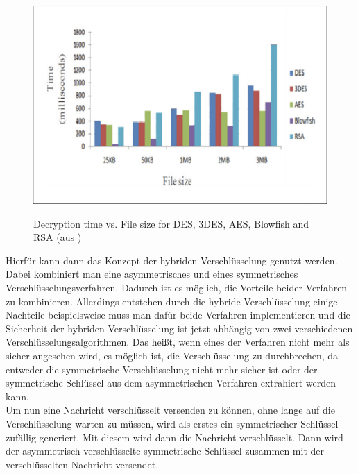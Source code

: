 \documentclass[12pt,a4paper]{scrartcl}
\begin{document}
\begin{figure}[h]		
\includegraphics[scale=0.6]{rsa_time} \\
\caption{Decryption time vs. File size for DES, 3DES, AES, Blowfish and RSA (aus \cite{rsatime})}
\label{fig:figure5}
\end{figure}


		Hierfür kann dann das Konzept der hybriden Verschlüsselung genutzt werden. Dabei kombiniert man eine asymmetrisches und eines symmetrisches Verschlüsselungsverfahren. Dadurch ist es möglich, die Vorteile beider Verfahren zu kombinieren. Allerdings entstehen durch die hybride Verschlüsselung einige Nachteile beispielsweise muss man dafür beide Verfahren implementieren und die Sicherheit der hybriden Verschlüsselung ist jetzt abhängig von zwei verschiedenen Verschlüsselungsalgorithmen. Das heißt, wenn eines der Verfahren nicht mehr als sicher angesehen wird, es möglich ist, die Verschlüsselung zu durchbrechen, da entweder die symmetrische Verschlüsselung nicht mehr sicher ist oder der symmetrische Schlüssel aus dem asymmetrischen Verfahren extrahiert werden kann. \\
		Um nun eine Nachricht verschlüsselt versenden zu können, ohne lange auf die Verschlüsselung warten zu müssen, wird als erstes ein symmetrischer Schlüssel zufällig generiert. Mit diesem wird dann die Nachricht verschlüsselt. Dann wird der asymmetrisch verschlüsselte symmetrische Schlüssel zusammen mit der verschlüsselten Nachricht versendet.

\pagebreak
\end{document}
